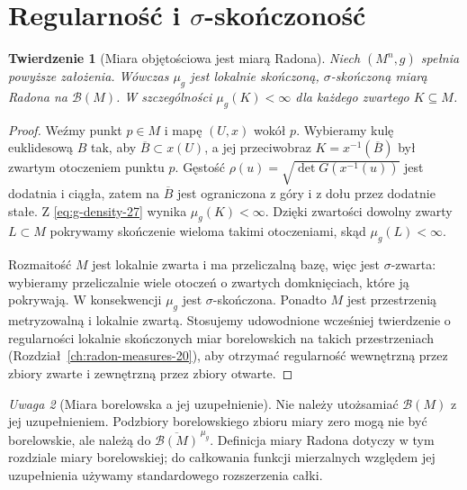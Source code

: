 \documentclass[11pt,a4paper,oneside]{book}
\numberwithin{equation}{chapter}
\theoremstyle{plain}
\newtheorem{twierdzenie}{Twierdzenie}[chapter]
\theoremstyle{definition}
\theoremstyle{remark}
\newtheorem{uwaga}[twierdzenie]{Uwaga}
\begin{document}
\section{Regularność i $\sigma$-skończoność}
\begin{twierdzenie}[Miara objętościowa jest miarą Radona]
\label{thm:riemann-radon-27}
Niech $(M^n,g)$ spełnia powyższe założenia. Wówczas
$\mu_g$ jest lokalnie skończoną, $\sigma$-skończoną
miarą Radona na $\mathcal B(M)$. W szczególności
$\mu_g(K)<\infty$ dla każdego zwartego $K\subseteq M$.
\end{twierdzenie}
\begin{proof}
Weźmy punkt $p\in M$ i mapę $(U,x)$ wokół $p$.
Wybieramy kulę euklidesową $B$ tak, aby
$\overline B\subset x(U)$, a jej przeciwobraz $K=x^{-1}(\overline B)$
był zwartym otoczeniem punktu $p$. Gęstość
$\rho(u)=\sqrt{\det G(x^{-1}(u))}$ jest dodatnia
i ciągła, zatem na $\overline B$ jest ograniczona
z góry i z dołu przez dodatnie stałe. Z
\eqref{eq:g-density-27} wynika $\mu_g(K)<\infty$.
Dzięki zwartości dowolny zwarty $L\subset M$ pokrywamy
skończenie wieloma takimi otoczeniami, skąd
$\mu_g(L)<\infty$.

Rozmaitość $M$ jest lokalnie zwarta i ma przeliczalną
bazę, więc jest $\sigma$-zwarta: wybieramy
przeliczalnie wiele otoczeń o zwartych domknięciach,
które ją pokrywają. W konsekwencji $\mu_g$ jest
$\sigma$-skończona. Ponadto $M$ jest przestrzenią
metryzowalną i lokalnie zwartą. Stosujemy
udowodnione wcześniej twierdzenie o regularności
lokalnie skończonych miar borelowskich na takich
przestrzeniach (Rozdział~\ref{ch:radon-measures-20}),
aby otrzymać regularność wewnętrzną przez zbiory
zwarte i zewnętrzną przez zbiory otwarte.
\end{proof}

\begin{uwaga}[Miara borelowska a jej uzupełnienie]
Nie należy utożsamiać $\mathcal B(M)$ z jej
uzupełnieniem. Podzbiory borelowskiego zbioru
miary zero mogą nie być borelowskie, ale należą do
$\overline{\mathcal B(M)}^{\,\mu_g}$.
Definicja miary Radona dotyczy w tym rozdziale
miary borelowskiej; do całkowania funkcji
mierzalnych względem jej uzupełnienia używamy
standardowego rozszerzenia całki.
\end{uwaga}
\end{document}
